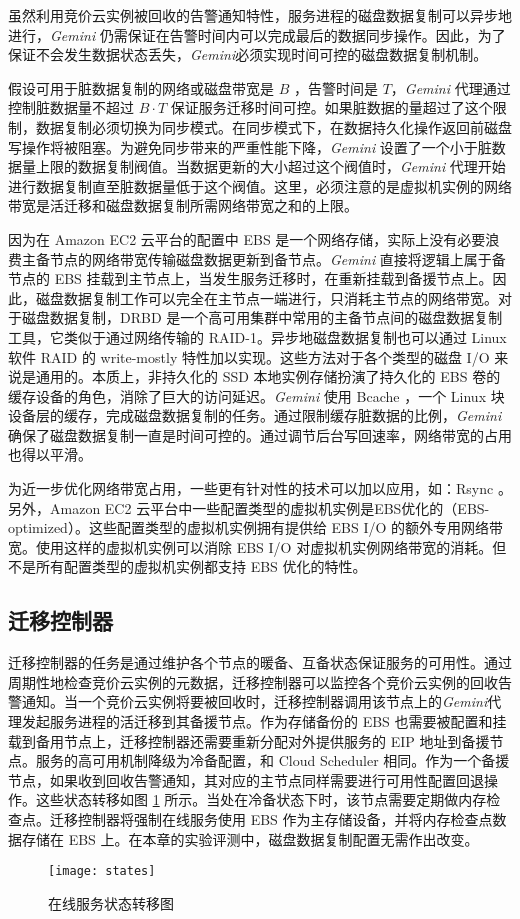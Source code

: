 虽然利用竞价云实例被回收的告警通知特性，服务进程的磁盘数据复制可以异步地进行，\emph{Gemini} 仍需保证在告警时间内可以完成最后的数据同步操作。因此，为了保证不会发生数据状态丢失，\emph{Gemini}必须实现时间可控的磁盘数据复制机制。

假设可用于脏数据复制的网络或磁盘带宽是 $B$ ，告警时间是 $T$，\emph{Gemini} 代理通过控制脏数据量不超过 $B \cdot T$ 保证服务迁移时间可控。如果脏数据的量超过了这个限制，数据复制必须切换为同步模式。在同步模式下，在数据持久化操作返回前磁盘写操作将被阻塞。为避免同步带来的严重性能下降，\emph{Gemini} 设置了一个小于脏数据量上限的数据复制阀值。当数据更新的大小超过这个阀值时，\emph{Gemini} 代理开始进行数据复制直至脏数据量低于这个阀值。这里，必须注意的是虚拟机实例的网络带宽是活迁移和磁盘数据复制所需网络带宽之和的上限。

因为在 Amazon EC2 云平台的配置中 EBS 是一个网络存储，实际上没有必要浪费主备节点的网络带宽传输磁盘数据更新到备节点。\emph{Gemini} 直接将逻辑上属于备节点的 EBS 挂载到主节点上，当发生服务迁移时，在重新挂载到备援节点上。因此，磁盘数据复制工作可以完全在主节点一端进行，只消耗主节点的网络带宽。对于磁盘数据复制，DRBD \cite{DRBD:2015} 是一个高可用集群中常用的主备节点间的磁盘数据复制工具，它类似于通过网络传输的 RAID-1。异步地磁盘数据复制也可以通过 Linux 软件 RAID \cite{Linux_md:2016} 的 write-mostly 特性加以实现。这些方法对于各个类型的磁盘 I/O 来说是通用的。本质上，非持久化的 SSD 本地实例存储扮演了持久化的 EBS 卷的缓存设备的角色，消除了巨大的访问延迟。\emph{Gemini} 使用 Bcache \cite{Bcache:2016}，一个 Linux 块设备层的缓存，完成磁盘数据复制的任务。通过限制缓存脏数据的比例，\emph{Gemini}确保了磁盘数据复制一直是时间可控的。通过调节后台写回速率，网络带宽的占用也得以平滑。

为近一步优化网络带宽占用，一些更有针对性的技术可以加以应用，如：Rsync \cite{Rsync:2016}。另外，Amazon EC2 云平台中一些配置类型的虚拟机实例是EBS优化的（EBS-optimized）。这些配置类型的虚拟机实例拥有提供给 EBS I/O 的额外专用网络带宽。使用这样的虚拟机实例可以消除 EBS I/O 对虚拟机实例网络带宽的消耗。但不是所有配置类型的虚拟机实例都支持 EBS 优化的特性。

\subsection{迁移控制器}
迁移控制器的任务是通过维护各个节点的暖备、互备状态保证服务的可用性。通过周期性地检查竞价云实例的元数据，迁移控制器可以监控各个竞价云实例的回收告警通知。当一个竞价云实例将要被回收时，迁移控制器调用该节点上的\emph{Gemini}代理发起服务进程的活迁移到其备援节点。作为存储备份的 EBS 也需要被配置和挂载到备用节点上，迁移控制器还需要重新分配对外提供服务的 EIP 地址到备援节点。服务的高可用机制降级为冷备配置，和 Cloud Scheduler \cite{He:2015:CCH:2749246.2749275} 相同。作为一个备援节点，如果收到回收告警通知，其对应的主节点同样需要进行可用性配置回退操作。这些状态转移如图 \ref{figure:states} 所示。当处在冷备状态下时，该节点需要定期做内存检查点。迁移控制器将强制在线服务使用 EBS 作为主存储设备，并将内存检查点数据存储在 EBS 上。在本章的实验评测中，磁盘数据复制配置无需作出改变。
\begin{figure}[]
  \centering
  \texttt{[image: states]}
  \caption{在线服务状态转移图}
  \label{figure:states}
\end{figure}

